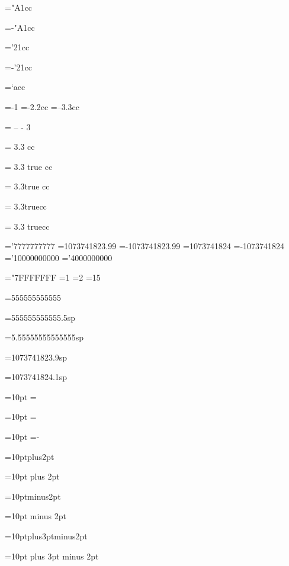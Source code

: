 ="A1cc
\showthe{}

=-"A1cc
\showthe{}

='21cc
\showthe{}

=-'21cc
\showthe{}

=`acc
\showthe{}

=-1
\showthe{}
=-2.2cc
\showthe{}
=--3.3cc
\showthe{}

  =  -- - 3  
\showthe{}

 = 3.3  cc
\showthe{}

 = 3.3 true cc
\showthe{}

 = 3.3true cc
\showthe{}

 = 3.3truecc
\showthe{}

 = 3.3 truecc
\showthe{}

='7777777777
\showthe{}
=1073741823.99
\showthe{}
=-1073741823.99
\showthe{}
=1073741824
\showthe{}
=-1073741824
\showthe{}
='10000000000
\showthe{}
='4000000000
\showthe{}

="7FFFFFFF
=1
\showthe{}
=2
\showthe{}
=15
\showthe{}

=555555555555
\showthe{}

=555555555555.5sp
\showthe{}

=5.55555555555555sp
\showthe{}

=1073741823.9sp
\showthe{}

=1073741824.1sp
\showthe{}

=10pt
=\relax\relax
\showthe{}

=10pt
=\relax
\showthe{}

=10pt
=-\relax
\showthe{}

=10ptplus2pt
\showthe{}

=10pt plus 2pt
\showthe{}

=10ptminus2pt
\showthe{}

=10pt minus 2pt
\showthe{}

=10ptplus3ptminus2pt
\showthe{}

=10pt plus 3pt minus 2pt
\showthe{}

